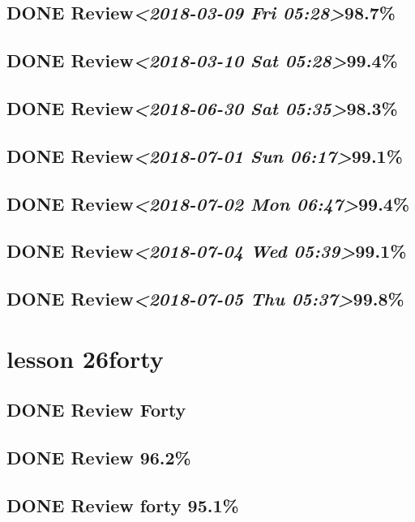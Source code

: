 \documentclass[11pt]{ctexart}
\begin{document}
\subsection{{\bfseries\sffamily DONE} Review\textit{<2018-03-09 Fri 05:28>}98.7\%}
\label{sec:org15b639f}
\subsection{{\bfseries\sffamily DONE} Review\textit{<2018-03-10 Sat 05:28>}99.4\%}
\label{sec:org75b6d8e}
\subsection{{\bfseries\sffamily DONE} Review\textit{<2018-06-30 Sat 05:35>}98.3\%}
\label{sec:orgdab2f4a}
\subsection{{\bfseries\sffamily DONE} Review\textit{<2018-07-01 Sun 06:17>}99.1\%}
\label{sec:orge26de61}
\subsection{{\bfseries\sffamily DONE} Review\textit{<2018-07-02 Mon 06:47>}99.4\%}
\label{sec:org238be33}
\subsection{{\bfseries\sffamily DONE} Review\textit{<2018-07-04 Wed 05:39>}99.1\%}
\label{sec:orga204b5d}
\subsection{{\bfseries\sffamily DONE} Review\textit{<2018-07-05 Thu 05:37>}99.8\%}
\label{sec:org519e6fe}
\section{lesson 26forty}
\label{sec:orga1bfc8a}
\subsection{{\bfseries\sffamily DONE} Review Forty}
\label{sec:org316bb46}
\subsection{{\bfseries\sffamily DONE} Review 96.2\%}
\label{sec:org1260461}
\subsection{{\bfseries\sffamily DONE} Review forty 95.1\%}
\label{sec:orgb46de9b}
\end{document}
